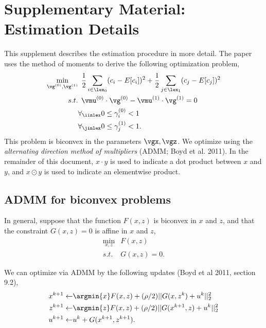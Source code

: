 \setlength\parskip{6pt}

\section{Supplementary Material: Estimation Details}

%

This supplement describes the estimation procedure in more detail. The paper uses the method of moments to derive the following optimization problem,
\begin{align}
\notag
\min_{\vg^{(0)}, \vg^{(1)}} & \:\: \frac{1}{2} \sum_{i\in \lex_0}(c_i - E[c_i])^2 + \frac{1}{2}\sum_{j \in \lex_1}(c_j - E[c_j])^2\\
\notag
s.t. &  \:\:  \vmu^{(0)} \cdot \vg^{(0)} - \vmu^{(1)} \cdot \vg^{(1)}=0\\
\notag
& \forall_{\iinlex} 0 \leq \gamma^{(0)}_i < 1\\
& \forall_{\jinlex} 0 \leq \gamma^{(1)}_j < 1.
\label{eq:supp-optimization}
\end{align}
This problem is biconvex in the parameters $\vgx,\vgz$. We optimize using the \emph{alternating direction method of multipliers} (ADMM; Boyd et al. 2011)\nocite{boyd2011distributed}. In the remainder of this document, $x \cdot y$ is used to indicate a dot product between $x$ and $y$, and $x \odot y$ is used to indicate an elementwise product.

\subsection{ADMM for biconvex problems}
In general, suppose that the function $F(x,z)$ is biconvex in $x$ and $z$, and that the constraint $G(x,z) = 0$ is affine in $x$ and $z$,
\begin{align}
\min_{x,z} & F(x,z) \\
s.t.& G(x,z) = 0.
\end{align}

We can optimize via ADMM by the following updates (Boyd et al 2011, section 9.2),
\begin{align}
x^{k+1} \gets & \argmin{x} F(x,z) + (\rho/2)||G(x,z^k) + u^k||_2^2\\
z^{k+1} \gets & \argmin{z} F(x,z) + (\rho/2)||G(x^{k+1},z) + u^k||_2^2\\
u^{k+1} \gets & u^k + G(x^{k+1},z^{k+1}).
\end{align}

